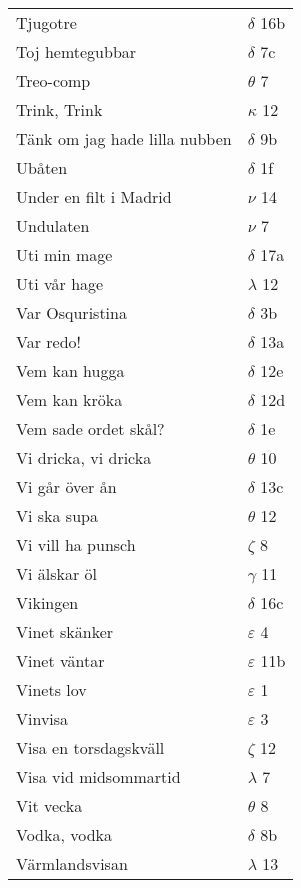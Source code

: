 \documentclass[a6paper,10pt]{article}
\begin{document}
\newpage
\setlength{\oddsidemargin}{-0.47in}
\begin{table}[!h]
\begin{tabular}{l l}
Tjugotre	&$\delta$ 16b\\
Toj hemtegubbar	&$\delta$ 7c\\
Treo-comp	&$\theta$ 7\\
Trink, Trink&	$\kappa$ 12\\
Tänk om jag hade lilla nubben&	$\delta$ 9b\\
Ubåten	&$\delta$ 1f\\
Under en filt i Madrid	&$\nu$ 14\\
Undulaten&	$\nu$ 7\\
Uti min mage	&$\delta$ 17a\\
Uti vår hage	&$\lambda$ 12\\
Var Osquristina	&$\delta$ 3b\\
Var redo!	&$\delta$ 13a\\
Vem kan hugga	&$\delta$ 12e\\
Vem kan kröka	&$\delta$ 12d\\
Vem sade ordet skål?	&$\delta$ 1e\\
Vi dricka, vi dricka&	$\theta$ 10\\
Vi går över ån	&$\delta$ 13c\\
Vi ska supa	&$\theta$ 12\\
Vi vill ha punsch	&$\zeta$ 8\\
Vi älskar öl	&$\gamma$ 11\\
Vikingen	&$\delta$ 16c\\
Vinet skänker	&$\varepsilon$ 4\\
Vinet väntar	&$\varepsilon$ 11b\\
Vinets lov	&$\varepsilon$ 1\\
Vinvisa	&$\varepsilon$ 3\\
Visa en torsdagskväll	&$\zeta$ 12\\
Visa vid midsommartid &$\lambda$ 7\\
Vit vecka	&$\theta$ 8\\
Vodka, vodka	&$\delta$ 8b\\
Värmlandsvisan	&$\lambda$ 13\\
\end{tabular}
\end{table}
\newpage
\setlength{\oddsidemargin}{-0.37in}
\end{document}
